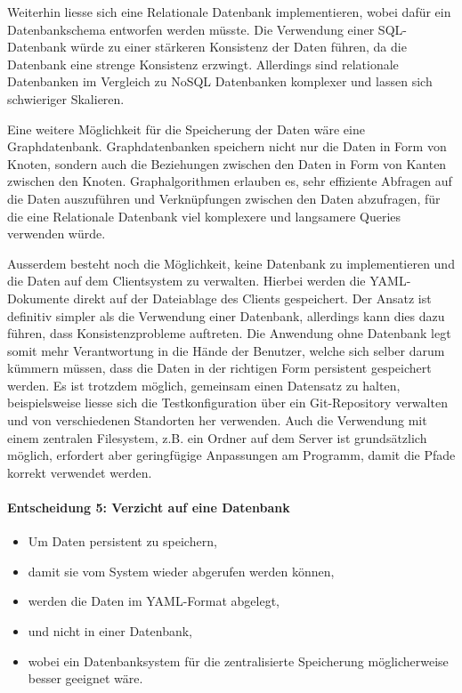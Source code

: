 \documentclass[]{subfiles}
\begin{document}
		Weiterhin liesse sich eine Relationale Datenbank implementieren, wobei dafür ein Datenbankschema entworfen werden müsste.
		Die Verwendung einer SQL-Datenbank würde zu einer stärkeren Konsistenz der Daten führen, da die Datenbank eine strenge Konsistenz erzwingt.
		Allerdings sind relationale Datenbanken im Vergleich zu NoSQL Datenbanken komplexer und lassen sich schwieriger Skalieren.

		Eine weitere Möglichkeit für die Speicherung der Daten wäre eine Graphdatenbank. Graphdatenbanken speichern nicht nur die Daten in Form von Knoten, sondern auch die Beziehungen zwischen den Daten in Form von Kanten zwischen den Knoten.
		Graphalgorithmen erlauben es, sehr effiziente Abfragen auf die Daten auszuführen und Verknüpfungen zwischen den Daten abzufragen, für die eine Relationale Datenbank viel komplexere und langsamere Queries verwenden würde.

		Ausserdem besteht noch die Möglichkeit, keine Datenbank zu implementieren und die Daten auf dem Clientsystem zu verwalten.
		Hierbei werden die YAML-Dokumente direkt auf der Dateiablage des Clients gespeichert. 
		Der Ansatz ist definitiv simpler als die Verwendung einer Datenbank, allerdings kann dies dazu führen, dass Konsistenzprobleme auftreten.
		Die Anwendung ohne Datenbank legt somit mehr Verantwortung in die Hände der Benutzer, welche sich selber darum kümmern müssen, dass die Daten in der richtigen Form persistent gespeichert werden.
		Es ist trotzdem möglich, gemeinsam einen Datensatz zu halten, beispielsweise liesse sich die Testkonfiguration über ein Git-Repository verwalten und von verschiedenen Standorten her verwenden.
		Auch die Verwendung mit einem zentralen Filesystem, z.B. ein Ordner auf dem Server ist grundsätzlich möglich, erfordert aber geringfügige Anpassungen am Programm, damit die Pfade korrekt verwendet werden.

		\paragraph{Entscheidung 5: Verzicht auf eine Datenbank}
		\begin{itemize}
			\item Um Daten persistent zu speichern, 
			\item damit sie vom System wieder abgerufen werden können,
			\item werden die Daten im YAML-Format abgelegt,
			\item und nicht in einer Datenbank,
			\item wobei ein Datenbanksystem für die zentralisierte Speicherung möglicherweise besser geeignet wäre.
		\end{itemize}
		\newpage
\end{document}
